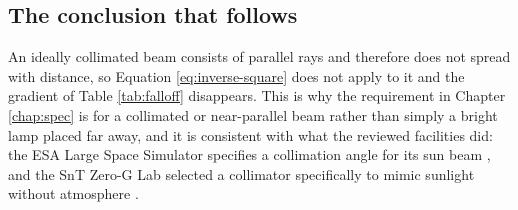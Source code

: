 \subsection{The conclusion that follows}

An ideally collimated beam consists of parallel rays and therefore does not spread with distance, so Equation \ref{eq:inverse-square} does not apply to it and the gradient of Table \ref{tab:falloff} disappears. This is why the requirement in Chapter \ref{chap:spec} is for a collimated or near-parallel beam rather than simply a bright lamp placed far away, and it is consistent with what the reviewed facilities did: the ESA Large Space Simulator specifies a collimation angle for its sun beam \cite{esa_lss}, and the SnT Zero-G Lab selected a collimator specifically to mimic sunlight without atmosphere \cite{pauly2022spacelab}.


